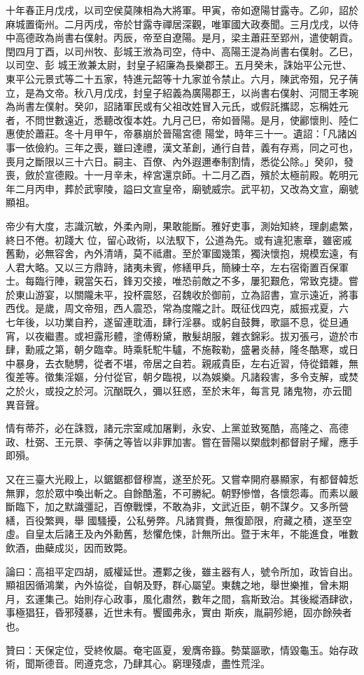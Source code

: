 \begin{pinyinscope}
 十年春正月戊戌，以司空侯莫陳相為大將軍。甲寅，帝如遼陽甘露寺。乙卯，詔於麻城置衛州。二月丙戌，帝於甘露寺禪居深觀，唯軍國大政奏聞。三月戊戌，以侍中高德政為尚書右僕射。丙辰，帝至自遼陽。是月，梁主蕭莊至郢州，遣使朝貢。閏四月丁酉，以司州牧、彭城王浟為司空，侍中、高陽王湜為尚書右僕射。乙巳，以司空、彭
 城王浟兼太尉，封皇子紹廉為長樂郡王。五月癸未，誅始平公元世、東平公元景式等二十五家，特進元韶等十九家並令禁止。六月，陳武帝殂，兄子蒨立，是為文帝。秋八月戊戌，封皇子紹義為廣陽郡王，以尚書右僕射、河間王孝琬為尚書左僕射。癸卯，詔諸軍民或有父祖改姓冒入元氏，或假託攜認，忘稱姓元者，不問世數遠近，悉聽改復本姓。九月己巳，帝如晉陽。是月，使酈懷則、陸仁惠使於蕭莊。冬十月甲午，帝暴崩於晉陽宮德
 陽堂，時年三十一。遺詔：「凡諸凶事一依儉約。三年之喪，雖曰達禮，漢文革創，通行自昔，義有存焉，同之可也，喪月之斷限以三十六日。嗣主、百僚、內外遐邇奉制割情，悉從公除。」癸卯，發喪，斂於宣德殿。十一月辛未，梓宮還京師。十二月乙酉，殯於太極前殿。乾明元年二月丙申，葬於武寧陵，謚曰文宣皇帝，廟號威宗。武平初，又改為文宣，廟號顯祖。



 帝少有大度，志識沉敏，外柔內剛，果敢能斷。雅好吏事，測始知終，理劇處繁，終日不倦。初踐大
 位，留心政術，以法馭下，公道為先。或有違犯憲章，雖密戚舊勳，必無容舍，內外清靖，莫不祗肅。至於軍國幾策，獨決懷抱，規模宏遠，有人君大略。又以三方鼎跱，諸夷未賓，修繕甲兵，簡練士卒，左右宿衛置百保軍士。每臨行陣，親當矢石，鋒刃交接，唯恐前敵之不多，屢犯艱危，常致克捷。嘗於東山游宴，以關隴未平，投杯震怒，召魏收於御前，立為詔書，宣示遠近，將事西伐。是歲，周文帝殂，西人震恐，常為度隴之計。既征伐四克，威振戎夏，六
 七年後，以功業自矜，遂留連耽湎，肆行淫暴。或躬自鼓舞，歌謳不息，從旦通宵，以夜繼晝。或袒露形體，塗傅粉黛，散髮胡服，雜衣錦彩。拔刃張弓，遊於市肆，勳戚之第，朝夕臨幸。時乘馲駝牛驢，不施鞍勒，盛暑炎赫，隆冬酷寒，或日中暴身，去衣馳騁，從者不堪，帝居之自若。親戚貴臣，左右近習，侍從錯雜，無復差等。徵集淫嫗，分付從官，朝夕臨視，以為娛樂。凡諸殺害，多令支解，或焚之於火，或投之於河。沉酗既久，彌以狂惑，至於末年，每言見
 諸鬼物，亦云聞異音聲。



 情有蒂芥，必在誅戮，諸元宗室咸加屠剿，永安、上黨並致冤酷，高隆之、高德政、杜弼、王元景、李蒨之等皆以非罪加害。嘗在晉陽以槊戲刺都督尉子耀，應手即殞。



 又在三臺大光殿上，以鋸鋸都督穆嵩，遂至於死。又嘗幸開府暴顯家，有都督韓悊無罪，忽於眾中喚出斬之。自餘酷濫，不可勝紀。朝野慘憎，各懷怨毒。而素以嚴斷臨下，加之默識彊記，百僚戰慄，不敢為非，文武近臣，朝不謀夕。又多所營繕，百役繁興，舉
 國騷擾，公私勞弊。凡諸賞賚，無復節限，府藏之積，遂至空虛。自皇太后諸王及內外勳舊，愁懼危悚，計無所出。暨于末年，不能進食，唯數飲酒，曲蘗成災，因而致斃。



 論曰：高祖平定四胡，威權延世。遷鄴之後，雖主器有人，號令所加，政皆自出。顯祖因循鴻業，內外協從，自朝及野，群心屬望。東魏之地，舉世樂推，曾未期月，玄運集己。始則存心政事，風化肅然，數年之間，翕斯致治。其後縱酒肆欲，事極猖狂，昏邪殘暴，近世未有。饗國弗永，實由
 斯疾，胤嗣殄絕，固亦餘殃者也。



 贊曰：天保定位，受終攸屬。奄宅區夏，爰膺帝籙。勢葉謳歌，情毀龜玉。始存政術，聞斯德音。罔遵克念，乃肆其心。窮理殘虐，盡性荒淫。



\end{pinyinscope}